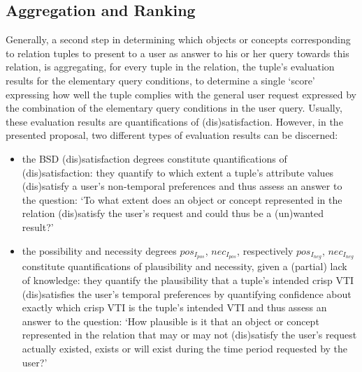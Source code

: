 \documentclass[runningheads,a4paper]{llncs}
\begin{document}
\subsection{Aggregation and Ranking}
Generally, a second step in determining which objects or concepts corresponding to relation tuples to present to a user as answer to his or her query towards this relation, is aggregating, for every tuple in the relation, the tuple's evaluation results for the elementary query conditions, to determine a single `score' expressing how well the tuple complies with the general user request expressed by the combination of the elementary query conditions in the user query. Usually, these evaluation results are quantifications of (dis)satisfaction. However, in the presented proposal, two different types of evaluation results can be discerned:

\begin{itemize}
	\item the BSD (dis)satisfaction degrees constitute quantifications of (dis)satisfaction: they quantify to which extent a tuple's attribute values (dis)satisfy a user's non-temporal preferences and thus assess an answer to the question: `To what extent does an object or concept represented in the relation (dis)satisfy the user's request and could thus be a (un)wanted result?'
	\item the possibility and necessity degrees $pos_{I_{pos}}$, $nec_{I_{pos}}$, respectively $pos_{I_{neg}}$, $nec_{I_{neg}}$ constitute quantifications of plausibility and necessity, given a (partial) lack of knowledge: they quantify the plausibility that a tuple's intended crisp VTI (dis)satisfies the user's temporal preferences by quantifying confidence about exactly which crisp VTI is the tuple's intended VTI and thus assess an answer to the question: `How plausible is it that an object or concept represented in the relation that may or may not (dis)satisfy the user's request actually existed, exists or will exist during the time period requested by the user?'
\end{itemize}
\end{document}
